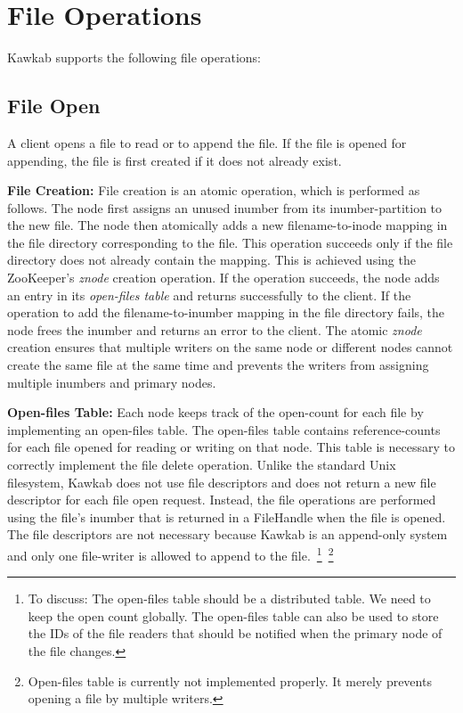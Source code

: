 \documentclass[]{article}
\newcommand{\subtopic}[1]{\vspace{1.5pt} \noindent \textbf{#1}}
\newcommand{\hl}[1]{\textcolor{hlcolor}{#1}}
\begin{document}
\section{File Operations}

Kawkab supports the following file operations:

\subsection{File Open}

A client opens a file to read or to append the file. If the file is opened for
appending, the file is first created if it does not already exist.

\subtopic{File Creation:} File creation is an atomic operation, which is
performed as follows.
The node first assigns an unused inumber from its inumber-partition to the new
file.  The node then atomically adds a new filename-to-inode mapping in the
file directory corresponding to the file. This operation succeeds only if the
file directory does not already contain the mapping. This is achieved using the
ZooKeeper's \textit{znode} creation operation.  If the operation succeeds, the
node adds an entry in its \textit{open-files table} and returns successfully to
the client.  If the operation to add the filename-to-inumber mapping in the
file directory fails, the node frees the inumber and returns an error to the
client.  The atomic \textit{znode} creation ensures that multiple writers on
the same node or different nodes cannot create the same file at the same time
and prevents the writers from assigning multiple inumbers and primary nodes.


\subtopic{Open-files Table:} Each node keeps track of the open-count for each
file by implementing an open-files table.  The open-files table contains
reference-counts for each file opened for reading or writing on that node.
This table is necessary to correctly implement the file delete operation.
Unlike the standard Unix filesystem, Kawkab does not use file descriptors and
does not return a new file descriptor for each file open request.  Instead, the
file operations are performed using the file's inumber that is returned in a
FileHandle when the file is opened.  The file descriptors are not necessary
because Kawkab is an append-only system and only one file-writer is allowed to
append to the file.~\footnote{\hl{To discuss: The open-files table should be a
distributed table. We need to keep the open count globally. The open-files
table can also be used to store the IDs of the file readers that should be
notified when the primary node of the file changes.}}~\footnote{Open-files
table is currently not implemented properly. It merely prevents opening
a file by multiple writers. 
}
\end{document}
